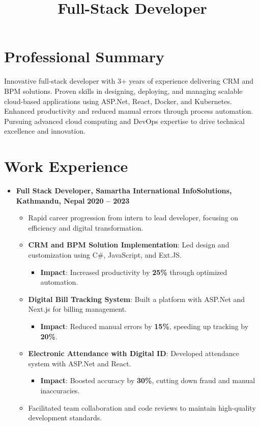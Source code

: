 \documentclass[11pt,a4paper,sans]{moderncv}
\title{Full-Stack Developer}
\newcommand{\sectionseparator}{\vspace{5pt}\par\noindent\makebox[\linewidth]{\rule{\textwidth}{0.4pt}}\vspace{0pt}}
\begin{document}
\makecvtitle

\section{Professional Summary}
Innovative full-stack developer with 3+ years of experience delivering CRM and BPM solutions. Proven skills in designing, deploying, and managing scalable cloud-based applications using ASP.Net, React, Docker, and Kubernetes. Enhanced productivity and reduced manual errors through process automation. Pursuing advanced cloud computing and DevOps expertise to drive technical excellence and innovation.

\sectionseparator

\section{Work Experience}
\begin{itemize}[leftmargin=*]
    \item \textbf{Full Stack Developer, Samartha International InfoSolutions, Kathmandu, Nepal} 
    \hfill \textbf{2020 -- 2023}
    \begin{itemize}
        \item Rapid career progression from intern to lead developer, focusing on efficiency and digital transformation.
        \item \textbf{CRM and BPM Solution Implementation}: Led design and customization using C\#, JavaScript, and Ext.JS.
        \begin{itemize}
            \item \textbf{Impact}: Increased productivity by \textbf{25\%} through optimized automation.
        \end{itemize}
        \item \textbf{Digital Bill Tracking System}: Built a platform with ASP.Net and Next.js for billing management.
        \begin{itemize}
            \item \textbf{Impact}: Reduced manual errors by \textbf{15\%}, speeding up tracking by \textbf{20\%}.
        \end{itemize}
        \item \textbf{Electronic Attendance with Digital ID}: Developed attendance system with ASP.Net and React.
        \begin{itemize}
            \item \textbf{Impact}: Boosted accuracy by \textbf{30\%}, cutting down fraud and manual inaccuracies.
        \end{itemize}
        \item Facilitated team collaboration and code reviews to maintain high-quality development standards.
    \end{itemize}
\end{itemize}
\end{document}

